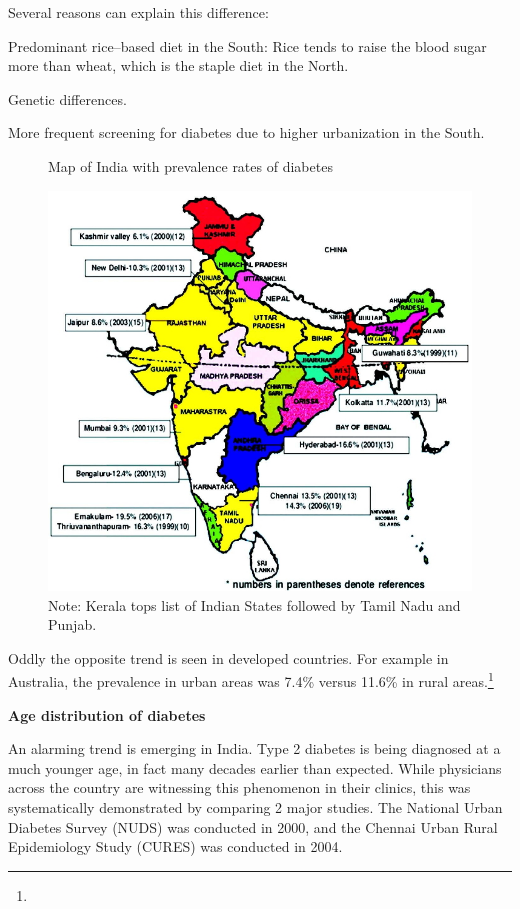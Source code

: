 Several reasons can explain this difference:

\item Predominant rice–based diet in the South: Rice tends to raise the blood sugar more than wheat, which is the staple diet in the North.

 \item Genetic differences.

 \item More frequent screening for diabetes due to higher urbanization in the South.


\begin{figure}
\caption{Map of India with prevalence rates of diabetes}
\includegraphics{images/027.jpg}
\caption{Note: Kerala tops list of Indian States followed by Tamil Nadu and Punjab.}
\end{figure}

Oddly the opposite trend is seen in developed countries. For example in Australia, the prevalence in urban areas was 7.4\% versus 11.6\% in rural areas.\footnote{}

\textbf{Age distribution of diabetes}

An alarming trend is emerging in India. Type 2 diabetes is being diagnosed at a much younger age, in fact many decades earlier than expected. While physicians across the country are witnessing this phenomenon in their clinics, this was systematically demonstrated by comparing 2 major studies. The National Urban Diabetes Survey (NUDS) was conducted in 2000, and the Chennai Urban Rural Epidemiology Study (CURES) was conducted in 2004.

